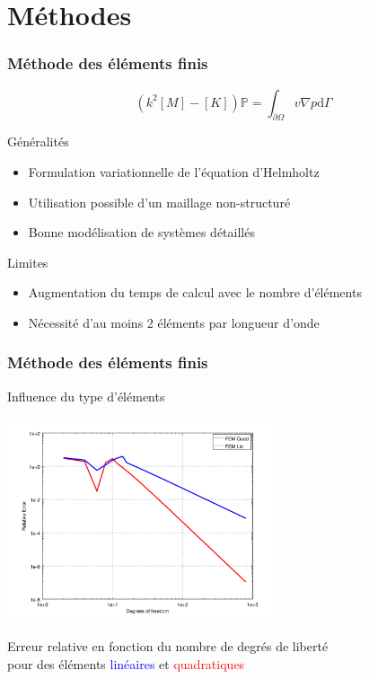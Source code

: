 \documentclass[10pt, compress]{beamer}
\newcommand\GP{\mathbb{P}}
\begin{document}
\section{Méthodes}

\begin{frame}
	\frametitle{Méthode des éléments finis}

	$$\left(k^2[M] - [K]\right)\GP = \int_{\partial\Omega} v\nabla p\mathrm{d}\Gamma$$

	\begin{block}{Généralités}
		\begin{itemize}
			\item Formulation variationnelle de l'équation d'Helmholtz
			\item Utilisation possible d'un maillage non-structuré
			\item Bonne modélisation de systèmes détaillés
		\end{itemize}
	\end{block}
	\pause
	\begin{block}{Limites}
		\begin{itemize}
			\item Augmentation du temps de calcul avec le nombre d'éléments
			\item Nécessité d'au moins 2 éléments par longueur d'onde
		\end{itemize}
	\end{block}
\end{frame}

\begin{frame}
	\frametitle{Méthode des éléments finis}

	\begin{block}{Influence du type d'éléments}
		\pause 
		\begin{center}
		\includegraphics[width=0.6\textwidth]{../report/part1/figs/FEM/simuls_1D/convergence.png}

        \footnotesize{Erreur relative en fonction du nombre de degrés de liberté\\
        pour des éléments \textcolor{blue}{linéaires} et \textcolor{red}{quadratiques}}
		\end{center}
	\end{block}
\end{frame}
\end{document}
